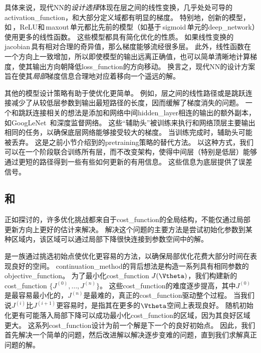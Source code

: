 具体来说，现代\gls{NN}的\emph{设计选择}体现在层之间的线性变换，几乎处处可导的\gls{activation_function}，和大部分定义域都有明显的梯度。
特别地，创新的模型，如\,，\gls{ReLU}和\,\gls{maxout}\,单元都比先前的模型（如基于\,\gls{sigmoid}\,单元的\gls{deep_network}）使用更多的线性函数。
这些模型都具有简化优化的性质。
如果线性变换的\,\gls{jacobian}\,具有相对合理的奇异值，那么梯度能够流经很多层。
此外，线性函数在一个方向上一致增加，所以即使模型的输出远离正确值，也可以简单清晰地计算梯度，使其输出方向朝降低\gls{loss_function}的方向移动。
换言之，现代\gls{NN}的设计方案旨在使其\emph{局部}梯度信息合理地对应着移向一个遥远的解。

其他的模型设计策略有助于使优化更简单。
例如，层之间的线性路径或是跳跃连接减少了从较低层参数到输出最短路径的长度，因而缓解了梯度消失的问题\citep{Srivastava-et-al-2015}。
一个和跳跃连接相关的想法是添加和网络中间\gls{hidden_layer}相连的输出的额外副本，如GoogLeNet~\citep{Szegedy-et-al-2014a}和深度监督网络\citep{Lee-et-al-2014}。
这些``辅助头''被训练来执行和网络顶层主要输出相同的任务，以确保底层网络能够接受较大的梯度。
当训练完成时，辅助头可能被丢弃。
这是之前小节介绍到的\gls{pretraining}策略的替代方法。
以这种方式，我们可以在一个阶段联合训练所有层，而不改变架构，使得中间层（特别是低层）能够通过更短的路径得到一些有些如何更新的有用信息。
这些信息为底层提供了误差信号。


\subsection{和}
\label{sec:continuation_methods_and_curriculum_learning}
正如探讨的，许多优化挑战都来自于\gls{cost_function}的全局结构，不能仅通过局部更新方向上更好的估计来解决。
解决这个问题的主要方法是尝试初始化参数到某种区域内，该区域可以通过局部下降很快连接到参数空间中的解。


是一族通过挑选初始点使优化更容易的方法，以确保局部优化花费大部分时间在表现良好的空间。
\gls{continuation_method}的背后想法是构造一系列具有相同参数的\gls{objective_function}。
为了最小化\gls{cost_function} $J(\Vtheta)$，我们构建新的\gls{cost_function} $\{J^{(0)},\dots,J^{(n)}\}$。
这些\gls{cost_function}的难度逐步提高，其中$J^{(0)}$是最容易最小化的，$J^{(n)}$是最难的，真正的\gls{cost_function}驱动整个过程。
当我们说$J^{(i)}$比$J^{(i+1)}$更容易时，是指其在更多的$\Vtheta$空间上表现良好。
随机初始化更有可能落入局部下降可以成功最小化\gls{cost_function}的区域，因为其良好区域更大。
这系列\gls{cost_function}设计为前一个解是下一个的良好初始点。
因此，我们首先解决一个简单的问题，然后改进解以解决逐步变难的问题，直到我们求解真正问题的解。

